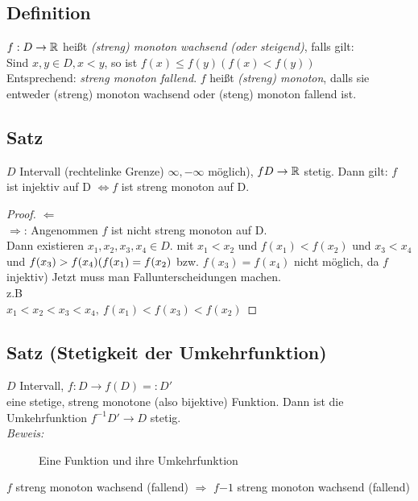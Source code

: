 \subsection{Definition}
$f: D \to \mathbb{R}$ hei\ss t {\em(streng) monoton wachsend (oder steigend)}, falls gilt:\\
 Sind $x,y \in D, x < y$, so ist $f(x) \leq f(y) (f(x) < f(y))$\\
Entsprechend: {\em streng monoton fallend}. $f$ hei\ss t {\em (streng) monoton}, dalls sie entweder (streng) monoton wachsend oder (steng) monoton fallend ist.
\subsection[Satz: Injektive Funktionen nur bei Monotonie]{Satz}
$D$ Intervall (rechte\hfill linke Grenze) $\infty,-\infty$ möglich), $f D \to \mathbb{R}$ stetig. Dann gilt: $f$ ist injektiv auf D $\Leftrightarrow f $ ist streng monoton auf D.\\
\begin{proof}
$\Leftarrow$ \checkmark \\
$\Rightarrow$: Angenommen $f$ ist nicht streng monoton auf D.\\
Dann existieren $x_1,x_2,x_3,x_4 \in D.$ mit $x_1 < x_2$ und $f(x_1) < f(x_2)$ und $x_3 < x_4$ und $f(x_3) > f(x_4)\\
(f(x_1) = f(x_2)$ bzw. $f(x_3) = f(x_4)$ nicht möglich, da $f$ injektiv)
Jetzt muss man Fallunterscheidungen machen.\\
z.B\\
$x_1 < x_2 < x_3 < x_4,\ f(x_1) < f(x_3) < f(x_2)$
\end{proof}
\subsection{Satz (Stetigkeit der Umkehrfunktion)}\label{sec:5.14}
$D$ Intervall, $f : D \to f(D) =: D'$\\
eine stetige, streng monotone (also bijektive) Funktion. Dann ist die Umkehrfunktion $f^{-1} D' \to D$ stetig.\\
{\em Beweis:} \cite{k5}
\begin{figure}[h!]
\centering
{}
\caption{Eine Funktion und ihre Umkehrfunktion}
\end{figure}
$f$ streng monoton wachsend (fallend) $\Rightarrow$ $f{-1}$ streng monoton wachsend (fallend)
